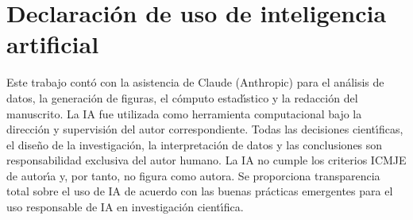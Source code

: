 \documentclass[11pt]{article}
\begin{document}

\section*{Declaraci\'{o}n de uso de inteligencia artificial}

Este trabajo cont\'{o} con la asistencia de Claude (Anthropic) para el an\'{a}lisis de datos, la generaci\'{o}n de figuras, el c\'{o}mputo estad\'{\i}stico y la redacci\'{o}n del manuscrito. La IA fue utilizada como herramienta computacional bajo la direcci\'{o}n y supervisi\'{o}n del autor correspondiente. Todas las decisiones cient\'{\i}ficas, el dise\~{n}o de la investigaci\'{o}n, la interpretaci\'{o}n de datos y las conclusiones son responsabilidad exclusiva del autor humano. La IA no cumple los criterios ICMJE de autor\'{\i}a y, por tanto, no figura como autora. Se proporciona transparencia total sobre el uso de IA de acuerdo con las buenas pr\'{a}cticas emergentes para el uso responsable de IA en investigaci\'{o}n cient\'{\i}fica.
\end{document}

